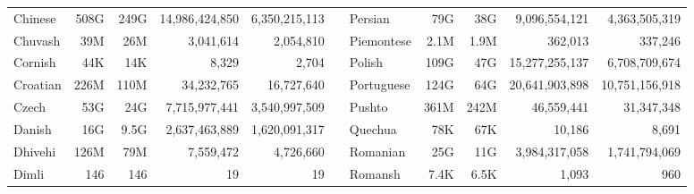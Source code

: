 \begin{table*}[t!]
\begin{tabular}{lrrrrclrrrr}
        Chinese                   & 508G                     & 249G                      & 14,986,424,850           & 6,350,215,113             &                          & Persian                   & 79G                      & 38G                       & 9,096,554,121            & 4,363,505,319             \\
        Chuvash                   & 39M                      & 26M                       & 3,041,614                & 2,054,810                 &                          & Piemontese                & 2.1M                     & 1.9M                      & 362,013                  & 337,246                   \\
        Cornish                   & 44K                      & 14K                       & 8,329                    & 2,704                     &                          & Polish                    & 109G                     & 47G                       & 15,277,255,137           & 6,708,709,674             \\
        Croatian                  & 226M                     & 110M                      & 34,232,765               & 16,727,640                &                          & Portuguese                & 124G                     & 64G                       & 20,641,903,898           & 10,751,156,918            \\
        Czech                     & 53G                      & 24G                       & 7,715,977,441            & 3,540,997,509             &                          & Pushto                    & 361M                     & 242M                      & 46,559,441               & 31,347,348                \\
        Danish                    & 16G                      & 9.5G                      & 2,637,463,889            & 1,620,091,317             &                          & Quechua                   & 78K                      & 67K                       & 10,186                   & 8,691                     \\
        Dhivehi                   & 126M                     & 79M                       & 7,559,472                & 4,726,660                 &                          & Romanian                  & 25G                      & 11G                       & 3,984,317,058            & 1,741,794,069             \\
        Dimli                     & 146                      & 146                       & 19                       & 19                        &                          & Romansh                   & 7.4K                     & 6.5K                      & 1,093                    & 960                       \\

\end{tabular}
\end{table*}
